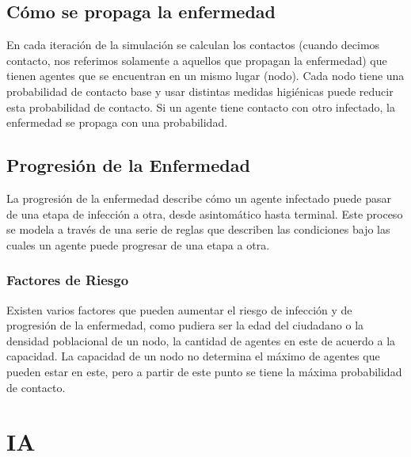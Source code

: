\subsection{Cómo se propaga la enfermedad}
En cada iteración de la simulación se calculan los contactos (cuando decimos contacto, nos referimos solamente a aquellos que propagan la enfermedad) que tienen agentes que se encuentran en un mismo lugar (nodo). Cada nodo tiene una probabilidad de contacto base y usar distintas medidas higiénicas puede reducir esta probabilidad de contacto. Si un agente tiene contacto con otro infectado, la enfermedad se propaga con una probabilidad.

\subsection{Progresión de la Enfermedad}
La progresión de la enfermedad describe cómo un agente infectado puede pasar de una etapa de infección a otra, desde asintomático hasta terminal. Este proceso se modela a través de una serie de reglas que describen las condiciones bajo las cuales un agente puede progresar de una etapa a otra.

\subsubsection{Factores de Riesgo}
Existen varios factores que pueden aumentar el riesgo de infección y de progresión de la enfermedad, como pudiera ser la edad del ciudadano o la densidad poblacional de un nodo, la cantidad de agentes en este de acuerdo a la capacidad. La capacidad de un nodo no determina el máximo de agentes que pueden estar en este, pero a partir de este punto se tiene la máxima probabilidad de contacto.

\section{IA}
